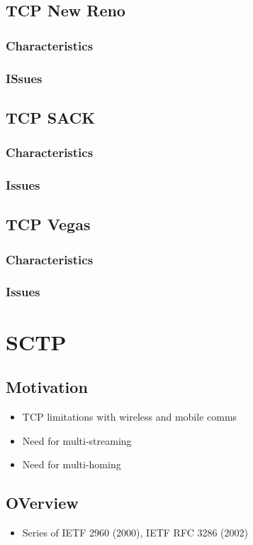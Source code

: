 \subsection{TCP New Reno}
\subsubsection{Characteristics}
\subsubsection{ISsues}
\subsection{TCP SACK}
\subsubsection{Characteristics}
\subsubsection{Issues}
\subsection{TCP Vegas}
\subsubsection{Characteristics}
\subsubsection{Issues}
\section{SCTP}
\subsection{Motivation}
\begin{itemize}
	\item TCP limitations with wireless and mobile comms
	\item Need for multi-streaming
	\item Need for multi-homing
\end{itemize}
\subsection{OVerview}
\begin{itemize}
	\item Series of IETF 2960 (2000), IETF RFC 3286 (2002)
\end{itemize}
